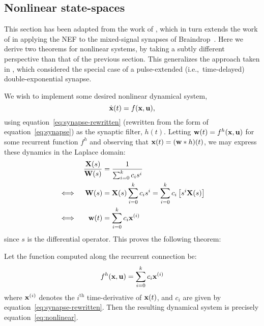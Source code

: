 \subsection{Nonlinear state-spaces}
\label{sec:nonlinear-extensions}

This section has been adapted from the work of \citet{voelker2017iscas}, which in turn extends the work of \citet{voelker2017neuromorphic} in applying the NEF to the mixed-signal synapses of Braindrop~\citep{braindrop2019}.
Here we derive two theorems for nonlinear systems, by taking a subtly different perspective than that of the previous section.
This generalizes the approach taken in \citet{voelker2017neuromorphic}, which considered the special case of a pulse-extended (i.e.,~time-delayed) double-exponential synapse.

We wish to implement some desired nonlinear dynamical system,
\begin{equation} \label{eq:nonlinear}
\dot{\mathbf{x}}(t) = f(\mathbf{x}, \mathbf{u}) \text{,}
\end{equation}
using equation~\ref{eq:synapse-rewritten} (rewritten from the form of equation~\ref{eq:synapse}) as the synaptic filter, $h(t)$.
Letting $\mathbf{w}(t) = f^h(\mathbf{x}, \mathbf{u})$ for some recurrent function $f^h$ and observing that $\mathbf{x}(t) = (\mathbf{w} \ast h)(t)$, we may express these dynamics in the Laplace domain:
\begin{align*}
&& \frac{\mathbf{X}(s)}{\mathbf{W}(s)} &= \frac{1}{\sum_{i=0}^k c_i s^i} \\
\iff && \mathbf{W}(s) &= \mathbf{X}(s) \sum_{i=0}^k c_i s^i = \sum_{i=0}^k c_i \left[ s^i \mathbf{X}(s) \right] \\
\iff && \mathbf{w}(t) &= \sum_{i=0}^k c_i \mathbf{x}^{(i)}
\end{align*}
since $s$ is the differential operator. This proves the following theorem:
\begin{theorem} \label{thm:p3cont-nonlinear}
Let the function computed along the recurrent connection be:
\begin{align}
f^h(\mathbf{x}, \mathbf{u}) = \sum_{i=0}^k c_i \mathbf{x}^{(i)}
\end{align}
where $\mathbf{x}^{(i)}$ denotes the $i^\text{th}$ time-derivative of $\mathbf{x}(t)$, and $c_i$ are given by equation~\ref{eq:synapse-rewritten}. Then the resulting dynamical system is precisely equation~\ref{eq:nonlinear}.
\end{theorem}

